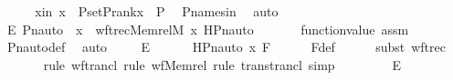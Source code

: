 \begin{isabellebody}
\ \ \isamarkupfalse%
\ \isamarkupfalse%
\ xin{\isacharcolon}{\kern0pt}\ {\isachardoublequoteopen}x\ {\isasymsubseteq}\ P{\isacharunderscore}{\kern0pt}set{\isacharparenleft}{\kern0pt}P{\isacharunderscore}{\kern0pt}rank{\isacharparenleft}{\kern0pt}x{\isacharparenright}{\kern0pt}{\isacharparenright}{\kern0pt}\ {\isasymtimes}\ P{\isachardoublequoteclose}\ \isamarkupfalse%
\ P{\isacharunderscore}{\kern0pt}names{\isacharunderscore}{\kern0pt}in\ \isamarkupfalse%
\ auto\ \isanewline
\ \ \isamarkupfalse%
\ \isamarkupfalse%
\ E{}{\isacharcolon}{\kern0pt}\ {\isachardoublequoteopen}Pn{\isacharunderscore}{\kern0pt}auto{\isacharparenleft}{\kern0pt}{\isasympi}{\isacharparenright}{\kern0pt}\ {\isacharbackquote}{\kern0pt}\ x\ {\isacharequal}{\kern0pt}\ wftrec{\isacharparenleft}{\kern0pt}Memrel{\isacharparenleft}{\kern0pt}M{\isacharparenright}{\kern0pt}{\isacharcircum}{\kern0pt}{\isacharplus}{\kern0pt}{\isacharcomma}{\kern0pt}\ x{\isacharcomma}{\kern0pt}\ HPn{\isacharunderscore}{\kern0pt}auto{\isacharparenleft}{\kern0pt}{\isasympi}{\isacharparenright}{\kern0pt}{\isacharparenright}{\kern0pt}{\isachardoublequoteclose}\ \isanewline
\ \ \ \ \isamarkupfalse%
\ function{\isacharunderscore}{\kern0pt}value\ assm\ \ \isamarkupfalse%
\ Pn{\isacharunderscore}{\kern0pt}auto{\isacharunderscore}{\kern0pt}def\ \isamarkupfalse%
\ auto\ \isanewline
\ \ \isamarkupfalse%
\ E{}{\isacharcolon}{\kern0pt}\isanewline
\ \ \ \ {\isachardoublequoteopen}{\isachardot}{\kern0pt}{\isachardot}{\kern0pt}{\isachardot}{\kern0pt}\ {\isacharequal}{\kern0pt}\ HPn{\isacharunderscore}{\kern0pt}auto{\isacharparenleft}{\kern0pt}{\isasympi}{\isacharcomma}{\kern0pt}\ x{\isacharcomma}{\kern0pt}\ F{\isacharparenright}{\kern0pt}{\isachardoublequoteclose}\isanewline
\ \ \ \ \isamarkupfalse%
\ F{\isacharunderscore}{\kern0pt}def\isanewline
\ \ \ \ \isamarkupfalse%
\ {\isacharparenleft}{\kern0pt}subst\ wftrec{\isacharparenright}{\kern0pt}\isanewline
\ \ \ \ \ \ \isamarkupfalse%
{\isacharparenleft}{\kern0pt}rule\ wf{\isacharunderscore}{\kern0pt}trancl{\isacharcomma}{\kern0pt}\ rule\ wf{\isacharunderscore}{\kern0pt}Memrel{\isacharcomma}{\kern0pt}\ rule\ trans{\isacharunderscore}{\kern0pt}trancl{\isacharcomma}{\kern0pt}\ simp{\isacharparenright}{\kern0pt}\isanewline
\ \ \ \ \isamarkupfalse%
\isanewline
\ \ \isamarkupfalse%
\ E{}{\isacharcolon}{\kern0pt}\isanewline

\end{isabellebody}
